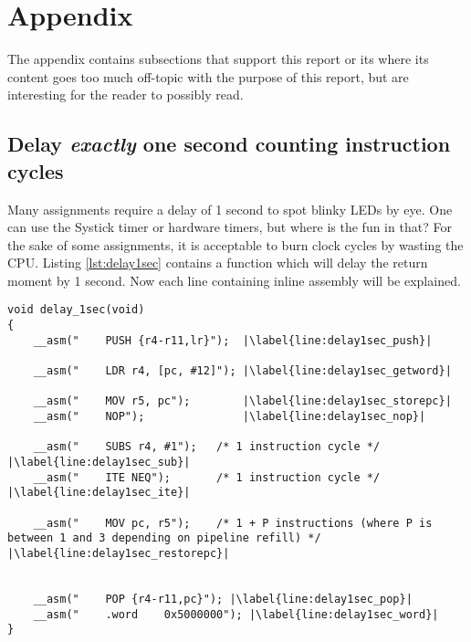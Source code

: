 \section{Appendix}

The appendix contains subsections that support this report or its where its content goes too much off-topic with the purpose of 
this report, but are interesting for the reader to possibly read.

\subsection{Delay \textit{exactly} one second counting instruction cycles}
\label{subsec:appendix_delay}

Many assignments require a delay of 1 second to spot blinky LEDs by eye.
One can use the Systick timer or hardware timers, but where is the fun in that?
For the sake of some assignments, it is acceptable to burn clock cycles by wasting the CPU.
Listing \ref{lst:delay1sec} contains a function which will delay the return moment by 1 second.
Now each line containing inline assembly will be explained.

\begin{lstlisting}[style=CStyle, caption={C function containing inline assembly to perform a delay of \textit{exactly} one second}, captionpos=b, label={lst:delay1sec}, escapechar=|]
void delay_1sec(void)
{
    __asm("    PUSH {r4-r11,lr}");  |\label{line:delay1sec_push}|
 
    __asm("    LDR r4, [pc, #12]"); |\label{line:delay1sec_getword}|
   
    __asm("    MOV r5, pc");        |\label{line:delay1sec_storepc}|
    __asm("    NOP");               |\label{line:delay1sec_nop}|
     
    __asm("    SUBS r4, #1");   /* 1 instruction cycle */ |\label{line:delay1sec_sub}|
    __asm("    ITE NEQ");       /* 1 instruction cycle */ |\label{line:delay1sec_ite}|
   
    __asm("    MOV pc, r5");    /* 1 + P instructions (where P is between 1 and 3 depending on pipeline refill) */ |\label{line:delay1sec_restorepc}|
     
     
    __asm("    POP {r4-r11,pc}"); |\label{line:delay1sec_pop}|
    __asm("    .word    0x5000000"); |\label{line:delay1sec_word}|
}
\end{lstlisting}

